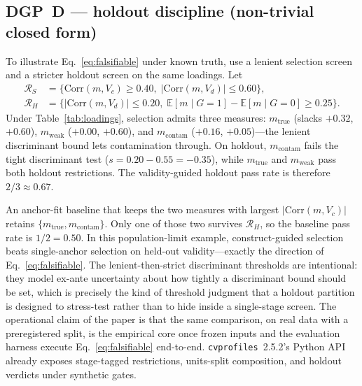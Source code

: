 \documentclass[10pt,letterpaper]{article}
\newcommand{\cvp}{\texttt{cvprofiles}}
\newcommand{\E}{\mathbb{E}}
\newcommand{\Rset}{\mathcal{R}}
\begin{document}
\subsection{DGP~D --- holdout discipline (non-trivial closed form)}
To illustrate Eq.~\eqref{eq:falsifiable} under known truth, use a lenient selection screen and a stricter holdout screen on the same loadings.
Let
\begin{align}
\Rset_S&=\bigl\{\mathrm{Corr}(m,V_{\!c})\ge 0.40,\; \bigl|\mathrm{Corr}(m,V_{\!d})\bigr|\le 0.60\bigr\},
\label{eq:dgpd-sel}\\
\Rset_H&=\bigl\{\bigl|\mathrm{Corr}(m,V_{\!d})\bigr|\le 0.20,\; \E[m\mid G{=}1]-\E[m\mid G{=}0]\ge 0.25\bigr\}.
\label{eq:dgpd-hold}
\end{align}
Under Table~\ref{tab:loadings}, selection admits three measures:
$m_{\mathrm{true}}$ (slacks $+0.32$, $+0.60$),
$m_{\mathrm{weak}}$ ($+0.00$, $+0.60$),
and $m_{\mathrm{contam}}$ ($+0.16$, $+0.05$)---the lenient discriminant bound lets contamination through.
On holdout, $m_{\mathrm{contam}}$ fails the tight discriminant test ($s=0.20-0.55=-0.35$), while $m_{\mathrm{true}}$ and $m_{\mathrm{weak}}$ pass both holdout restrictions.
The validity-guided holdout pass rate is therefore $2/3\approx 0.67$.

An anchor-fit baseline that keeps the two measures with largest $|\mathrm{Corr}(m,V_{\!c})|$ retains $\{m_{\mathrm{true}},m_{\mathrm{contam}}\}$.
Only one of those two survives $\Rset_H$, so the baseline pass rate is $1/2=0.50$.
In this population-limit example, construct-guided selection beats single-anchor selection on held-out validity---exactly the direction of Eq.~\eqref{eq:falsifiable}.
The lenient-then-strict discriminant thresholds are intentional: they model ex-ante uncertainty about how tightly a discriminant bound should be set, which is precisely the kind of threshold judgment that a holdout partition is designed to stress-test rather than to hide inside a single-stage screen.
The operational claim of the paper is that the same comparison, on real data with a preregistered split, is the empirical core once frozen inputs and the evaluation harness execute Eq.~\eqref{eq:falsifiable} end-to-end.
\cvp{}~2.5.2's Python API already exposes stage-tagged restrictions, units-split composition, and holdout verdicts under synthetic gates.
\end{document}
